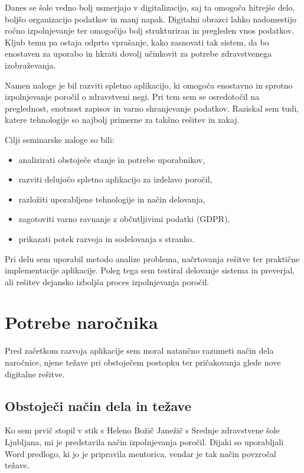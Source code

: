 \documentclass[12pt,a4paper]{article}
\begin{document}
Danes se \v{s}ole vedno bolj usmerjajo v digitalizacijo, saj ta omogo\v{c}a hitrej\v{s}e delo, bolj\v{s}o organizacijo podatkov in manj napak. Digitalni obrazci lahko nadomestijo ro\v{c}no izpolnjevanje ter omogo\v{c}ijo bolj strukturiran in pregleden vnos podatkov. Kljub temu pa ostaja odprto vpra\v{s}anje, kako zasnovati tak sistem, da bo enostaven za uporabo in hkrati dovolj u\v{c}inkovit za potrebe zdravstvenega izobra\v{z}evanja.

Namen naloge je bil razviti spletno aplikacijo, ki omogo\v{c}a enostavno in sprotno izpolnjevanje poro\v{c}il o zdravstveni negi. Pri tem sem se osredoto\v{c}il na preglednost, enotnost zapisov in varno shranjevanje podatkov. Raziskal sem tudi, katere tehnologije so najbolj primerne za tak\v{s}no re\v{s}itev in zakaj.

Cilji seminarske naloge so bili:
\begin{itemize}
    \item analizirati obstoje\v{c}e stanje in potrebe uporabnikov,
    \item razviti delujo\v{c}o spletno aplikacijo za izdelavo poro\v{c}il,
    \item razlo\v{z}iti uporabljene tehnologije in na\v{c}in delovanja,
    \item zagotoviti varno ravnanje z ob\v{c}utljivimi podatki (GDPR),
    \item prikazati potek razvoja in sodelovanja s stranko.
\end{itemize}

Pri delu sem uporabil metodo analize problema, na\v{c}rtovanja re\v{s}itve ter prakti\v{c}ne implementacije aplikacije. Poleg tega sem testiral delovanje sistema in preverjal, ali re\v{s}itev dejansko izbolj\v{s}a proces izpolnjevanja poro\v{c}il.

\section{Potrebe naro\v{c}nika}

Pred za\v{c}etkom razvoja aplikacije sem moral natan\v{c}no razumeti na\v{c}in dela naro\v{c}nice, njene te\v{z}ave pri obstoje\v{c}em postopku ter pri\v{c}akovanja glede nove digitalne re\v{s}itve.
\subsection{Obstoje\v{c}i na\v{c}in dela in te\v{z}ave}
Ko sem prvič stopil v stik s Heleno Božič Janežič s Srednje zdravstvene šole Ljubljana, mi je predstavila način izpolnjevanja poročil. Dijaki so uporabljali Word predlogo, ki jo je pripravila mentorica, vendar je tak način povzročal težave.
\end{document}
